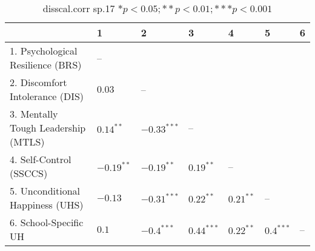 \begin{table}[ht]
\centering
\begin{tabular}{lllllll}
  \hline
 & 1 & 2 & 3 & 4 & 5 & 6 \\ 
  \hline
1. Psychological Resilience (BRS) & -- &  &  &  &  &  \\ 
  2. Discomfort Intolerance (DIS) & $0.03$ & -- &  &  &  &  \\ 
  3. Mentally Tough Leadership (MTLS) & $0.14^{**}$ & $-0.33^{***}$ & -- &  &  &  \\ 
  4. Self-Control (SSCCS) & $-0.19^{**}$ & $-0.19^{**}$ & $0.19^{**}$ & -- &  &  \\ 
  5. Unconditional Happiness (UHS) & $-0.13$ & $-0.31^{***}$ & $0.22^{**}$ & $0.21^{**}$ & -- &  \\ 
  6. School-Specific UH & $0.1$ & $-0.4^{***}$ & $0.44^{***}$ & $0.22^{**}$ & $0.4^{***}$ & -- \\ 
   \hline
\end{tabular}
\caption{disscal.corr sp.17 $* p < 0.05; ** p < 0.01; *** p < 0.001$} 
\label{freq_corr.disscal.corr.sp.17}
\end{table}
